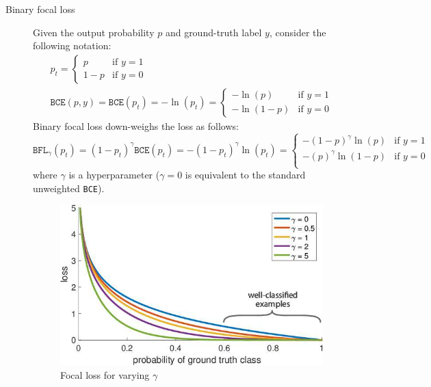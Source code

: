\begin{description}
        \begin{description}
            \item[Binary focal loss] 
                Given the output probability $p$ and ground-truth label $y$, consider the following notation:
                \[
                    \begin{gathered}
                        p_t = \begin{cases}
                            p & \text{if $y=1$} \\
                            1-p & \text{if $y=0$}
                        \end{cases} 
                        \\
                        \texttt{BCE}(p, y) = \texttt{BCE}(p_t) = -\ln(p_t) = \begin{cases}
                            -\ln(p) & \text{if $y=1$} \\
                            -\ln(1-p) & \text{if $y=0$}
                        \end{cases}
                    \end{gathered}
                \]
                Binary focal loss down-weighs the loss as follows:
                \[ 
                    \texttt{BFL}_\gamma(p_t) = 
                    (1-p_t)^\gamma\texttt{BCE}(p_t) = 
                    -(1-p_t)^\gamma \ln(p_t) =
                    \begin{cases}
                        -(1-p)^\gamma \ln(p) & \text{if $y=1$} \\
                        -(p)^\gamma \ln(1-p) & \text{if $y=0$} \\
                    \end{cases}
                \]
                where $\gamma$ is a hyperparameter ($\gamma=0$ is equivalent to the standard unweighted \texttt{BCE}).

                \begin{figure}[H]
                    \centering
                    \includegraphics[width=0.45\linewidth]{./img/_focal_loss.jpg}
                    \caption{Focal loss for varying $\gamma$}
                \end{figure}


\end{description}
\end{description}
